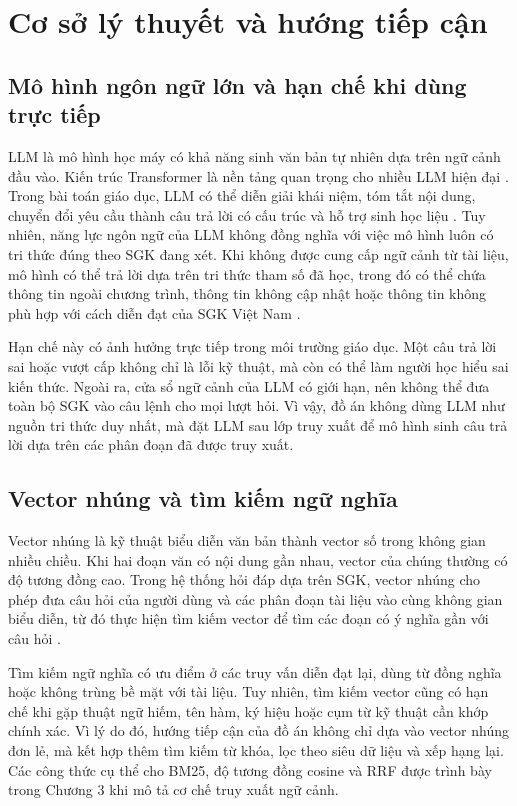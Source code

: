 \documentclass[../DoAn.tex]{subfiles}
\begin{document}
\section{Cơ sở lý thuyết và hướng tiếp cận}

\subsection{Mô hình ngôn ngữ lớn và hạn chế khi dùng trực tiếp}

LLM là mô hình học máy có khả năng sinh văn bản tự nhiên dựa trên ngữ cảnh đầu vào. Kiến trúc Transformer là nền tảng quan trọng cho nhiều LLM hiện đại \cite{vaswani2017attention}. Trong bài toán giáo dục, LLM có thể diễn giải khái niệm, tóm tắt nội dung, chuyển đổi yêu cầu thành câu trả lời có cấu trúc và hỗ trợ sinh học liệu \cite{wang2024llmeducation,yan2024llm_edu}. Tuy nhiên, năng lực ngôn ngữ của LLM không đồng nghĩa với việc mô hình luôn có tri thức đúng theo SGK đang xét. Khi không được cung cấp ngữ cảnh từ tài liệu, mô hình có thể trả lời dựa trên tri thức tham số đã học, trong đó có thể chứa thông tin ngoài chương trình, thông tin không cập nhật hoặc thông tin không phù hợp với cách diễn đạt của SGK Việt Nam \cite{ji2023hallucination}.

Hạn chế này có ảnh hưởng trực tiếp trong môi trường giáo dục. Một câu trả lời sai hoặc vượt cấp không chỉ là lỗi kỹ thuật, mà còn có thể làm người học hiểu sai kiến thức. Ngoài ra, cửa sổ ngữ cảnh của LLM có giới hạn, nên không thể đưa toàn bộ SGK vào câu lệnh cho mọi lượt hỏi. Vì vậy, đồ án không dùng LLM như nguồn tri thức duy nhất, mà đặt LLM sau lớp truy xuất để mô hình sinh câu trả lời dựa trên các phân đoạn đã được truy xuất.

\subsection{Vector nhúng và tìm kiếm ngữ nghĩa}

Vector nhúng là kỹ thuật biểu diễn văn bản thành vector số trong không gian nhiều chiều. Khi hai đoạn văn có nội dung gần nhau, vector của chúng thường có độ tương đồng cao. Trong hệ thống hỏi đáp dựa trên SGK, vector nhúng cho phép đưa câu hỏi của người dùng và các phân đoạn tài liệu vào cùng không gian biểu diễn, từ đó thực hiện tìm kiếm vector để tìm các đoạn có ý nghĩa gần với câu hỏi \cite{reimers2019sbert,karpukhin2020dpr}.

Tìm kiếm ngữ nghĩa có ưu điểm ở các truy vấn diễn đạt lại, dùng từ đồng nghĩa hoặc không trùng bề mặt với tài liệu. Tuy nhiên, tìm kiếm vector cũng có hạn chế khi gặp thuật ngữ hiếm, tên hàm, ký hiệu hoặc cụm từ kỹ thuật cần khớp chính xác. Vì lý do đó, hướng tiếp cận của đồ án không chỉ dựa vào vector nhúng đơn lẻ, mà kết hợp thêm tìm kiếm từ khóa, lọc theo siêu dữ liệu và xếp hạng lại. Các công thức cụ thể cho BM25, độ tương đồng cosine và RRF được trình bày trong Chương 3 khi mô tả cơ chế truy xuất ngữ cảnh.
\end{document}
